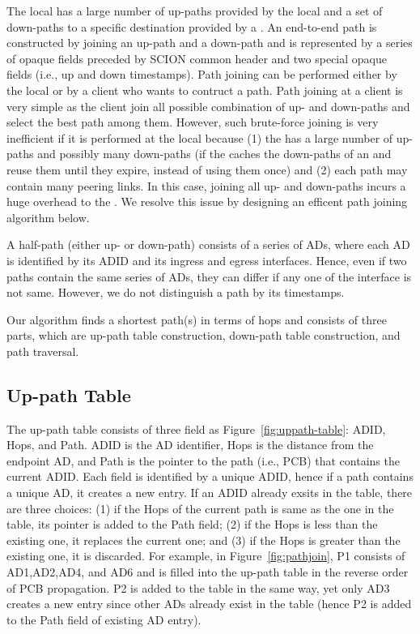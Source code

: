 The local \PS has a large number of up-paths provided by the local \BS and a set of down-paths to a specific destination \AD provided by a \TDC \PS.
An end-to-end path is constructed by joining an up-path and a down-path and is represented by a series of opaque fields preceded by SCION common header and two special opaque fields (i.e., up and down timestamps). Path joining can be performed either by the local \PS or by a client who wants to contruct a path. Path joining at a client is very simple as the client join all possible combination of up- and down-paths and select the best path among them. However, such brute-force joining is very inefficient if it is performed at the local \PS because (1) the \PS has a large number of up-paths and possibly many down-paths (if the \PS caches the down-paths of an \AD and reuse them until they expire, instead of using them once) and (2) each path may contain many peering links. In this case, joining all up- and down-paths incurs a huge overhead to the \PS. We resolve this issue by designing an efficent path joining algorithm below.

A half-path (either up- or down-path) consists of a series of ADs, where each AD is identified by its ADID and its ingress and egress interfaces. Hence, even if two paths contain the same series of ADs, they can differ if any one of the interface is not same. However, we do not distinguish a path by its timestamps.

Our algorithm finds a shortest path(s) in terms of \AD hops and consists of three parts, which are up-path table construction, down-path table construction, and path traversal.

\subsection{Up-path Table}
The up-path table consists of three field as Figure~\ref{fig:uppath-table}: ADID, Hops, and Path. ADID is the AD identifier, Hops is the distance from the endpoint AD, and Path is the pointer to the path (i.e., PCB) that contains the current ADID. Each field is identified by a unique ADID, hence if a path contains a unique AD, it creates a new entry. If an ADID already exsits in the table, there are three choices: (1) if the Hops of the current path is same as the one in the table, its pointer is added to the Path field; (2) if the Hops is less than the existing one, it replaces the current one; and (3) if the Hops is greater than the existing one, it is discarded. For example, in Figure~\ref{fig:pathjoin}, P1 consists of AD1,AD2,AD4, and AD6 and is filled into the up-path table in the reverse order of PCB propagation. P2 is added to the table in the same way, yet only AD3 creates a new entry since other ADs already exist in the table (hence P2 is added to the Path field of existing AD entry).


